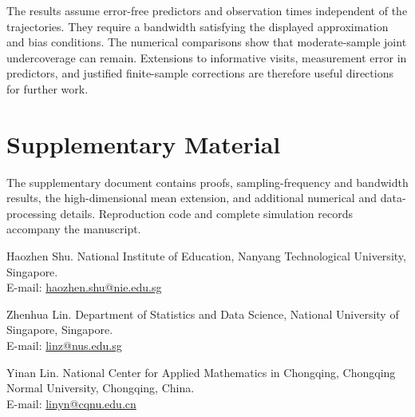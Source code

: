 \documentclass[12pt]{article}
\numberwithin{equation}{section}
\newcommand{\referencefont}{\bibhang=1.7pc\bibsep=2pt\fontsize{9}{14pt plus.8pt minus .6pt}\selectfont}
\begin{document}
The results assume error-free predictors and observation times independent
of the trajectories. They require a bandwidth satisfying the displayed
approximation and bias conditions. The numerical comparisons show that
moderate-sample joint undercoverage can remain. Extensions to informative
visits, measurement error in predictors, and justified finite-sample
corrections are therefore useful directions for further work.


\section*{Supplementary Material}
The supplementary document contains proofs, sampling-frequency and bandwidth results, the high-dimensional mean extension, and additional numerical and data-processing details. Reproduction code and complete simulation records accompany the manuscript.
\referencefont



\bigskip
\noindent\begin{minipage}{\textwidth}
\noindent Haozhen Shu. National Institute of Education, Nanyang Technological University, Singapore.\\
E-mail: \href{mailto:haozhen.shu@nie.edu.sg}{haozhen.shu@nie.edu.sg}
\medskip

\noindent Zhenhua Lin. Department of Statistics and Data Science, National University of Singapore, Singapore.\\
E-mail: \href{mailto:linz@nus.edu.sg}{linz@nus.edu.sg}
\medskip

\noindent Yinan Lin. National Center for Applied Mathematics in Chongqing, Chongqing Normal University, Chongqing, China.\\
E-mail: \href{mailto:linyn@cqnu.edu.cn}{linyn@cqnu.edu.cn}
\end{minipage}
\end{document}
